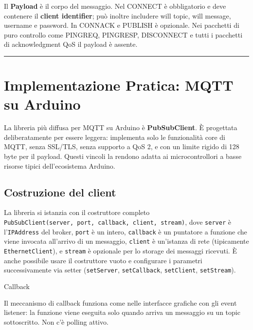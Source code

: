 \documentclass[
  italian,
  openany]{book}
\begin{document}
Il \textbf{Payload} è il corpo del messaggio. Nel CONNECT è obbligatorio
e deve contenere il \textbf{client identifier}; può inoltre includere
will topic, will message, username e password. In CONNACK e PUBLISH è
opzionale. Nei pacchetti di puro controllo come PINGREQ, PINGRESP,
DISCONNECT e tutti i pacchetti di acknowledgment QoS il payload è
assente.

\begin{center}\rule{0.5\linewidth}{0.5pt}\end{center}

\section{Implementazione Pratica: MQTT su
Arduino}\label{implementazione-pratica-mqtt-su-arduino}

La libreria più diffusa per MQTT su Arduino è \textbf{PubSubClient}. È
progettata deliberatamente per essere leggera: implementa solo le
funzionalità core di MQTT, senza SSL/TLS, senza supporto a QoS 2, e con
un limite rigido di 128 byte per il payload. Questi vincoli la rendono
adatta ai microcontrollori a basse risorse tipici dell'ecosistema
Arduino.

\subsection{Costruzione del client}\label{costruzione-del-client}

La libreria si istanzia con il costruttore completo
\texttt{PubSubClient(server,\ port,\ callback,\ client,\ stream)}, dove
\texttt{server} è l'\texttt{IPAddress} del broker, \texttt{port} è un
intero, \texttt{callback} è un puntatore a funzione che viene invocata
all'arrivo di un messaggio, \texttt{client} è un'istanza di rete
(tipicamente \texttt{EthernetClient}), e \texttt{stream} è opzionale per
lo storage dei messaggi ricevuti. È anche possibile usare il costruttore
vuoto e configurare i parametri successivamente via setter
(\texttt{setServer}, \texttt{setCallback}, \texttt{setClient},
\texttt{setStream}).

\begin{calloutnote}{Callback}

Il meccanismo di callback funziona come nelle interfacce grafiche con
gli event listener: la funzione viene eseguita solo quando arriva un
messaggio su un topic sottoscritto. Non c'è polling attivo.

\end{calloutnote}
\end{document}
